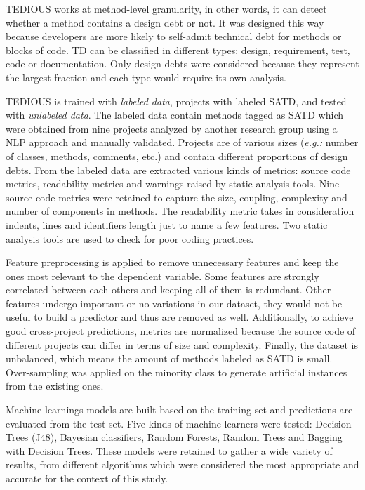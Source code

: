 \ac{TEDIOUS} works at method-level granularity, in other words, it can detect whether a method contains a design debt or not. It was designed this way because developers are more likely to self-admit technical debt for methods or blocks of code. \ac{TD} can be classified in different types: design, requirement, test, code or documentation. Only design debts were considered because they represent the largest fraction and each type would require its own analysis.  \par

\ac{TEDIOUS} is trained with \emph{labeled data}, projects with labeled \ac{SATD}, and tested with \emph{unlabeled data}. The labeled data contain methods tagged as \ac{SATD} which were obtained from nine projects analyzed by another research group using a \ac{NLP} approach and manually validated. Projects are of various sizes (\emph{e.g.:} number of classes, methods, comments, etc.) and contain different proportions of design debts. From the labeled data are extracted various kinds of metrics: source code metrics, readability metrics and warnings raised by static analysis tools. Nine source code metrics were retained to capture the size, coupling, complexity and number of components in methods. The readability metric takes in consideration indents, lines and identifiers length just to name a few features. Two static analysis tools are used to check for poor coding practices. \par

Feature preprocessing is applied to remove unnecessary features and keep the ones most relevant to the dependent variable. Some features are strongly correlated between each others and keeping all of them is redundant. Other features undergo important or no variations in our dataset, they would not be useful to build a predictor and thus are removed as well. Additionally, to achieve good cross-project predictions, metrics are normalized because the source code of different projects can differ in terms of size and complexity. Finally, the dataset is unbalanced, which means the amount of methods labeled as \ac{SATD} is small. Over-sampling was applied on the minority class to generate artificial instances from the existing ones. \par

Machine learnings models are built based on the training set and predictions are evaluated from the test set. Five kinds of machine learners were tested: Decision Trees (J48), Bayesian classifiers, Random Forests, Random Trees and Bagging with Decision Trees. These models were retained to gather a wide variety of results, from different algorithms which were considered the most appropriate and accurate for the context of this study. \par

